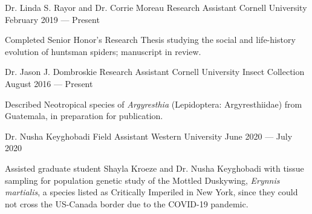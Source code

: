 

\begin{cventries}

  \cventry
    {Dr. Linda S. Rayor and Dr. Corrie Moreau} %
    {Research Assistant} %
    {Cornell University} %
    {February 2019 — Present} %
    {
      \begin{cvitems} %
        \item {Completed Senior Honor's Research Thesis studying the social and life-history evolution of huntsman spiders; manuscript in review.}
      \end{cvitems}
    }

  \cventry
    {Dr. Jason J. Dombroskie} %
    {Research Assistant} %
    {Cornell University Insect Collection} %
    {August 2016 — Present} %
    {
      \begin{cvitems} %
        \item {Described Neotropical species of \textit{Argyresthia} (Lepidoptera: Argyresthiidae) from Guatemala, in preparation for publication.}
      \end{cvitems}
    }

  \cventry
    {Dr. Nusha Keyghobadi} %
    {Field Assistant} %
    {Western University} %
    {June 2020 — July 2020} %
    {
      \begin{cvitems} %
        \item {Assisted graduate student Shayla Kroeze and Dr. Nusha Keyghobadi with tissue sampling for population genetic study of the Mottled Duskywing, \textit{Erynnis martialis}, a species listed as Critically Imperiled in New York, since they could not cross the US-Canada border due to the COVID-19 pandemic.}
      \end{cvitems}
    }


\end{cventries}
